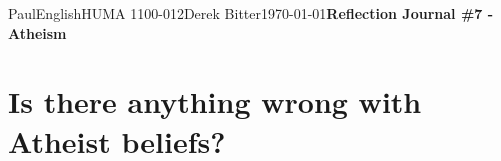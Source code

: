 \documentclass[12pt,letterpaper]{article}
\begin{document}
\begin{mla}{Paul}{English}{HUMA 1100-012}{Derek
    Bitter}{\today}{\textbf{Reflection Journal \#7 - Atheism}}

\section{Is there anything wrong with Atheist beliefs?}


%

%









\end{mla}
\end{document}
